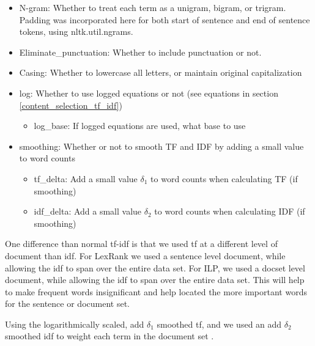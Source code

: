     \begin{itemize}
       
        \item N-gram: Whether to treat each term as a unigram, bigram, or trigram. Padding was incorporated here for both start of sentence and end of sentence tokens, using nltk.util.ngrams.

        \item Eliminate\_punctuation: Whether to include punctuation or not.

        \item Casing: Whether to lowercase all letters, or maintain original capitalization

        \item log: Whether to use logged equations or not (see equations in section \ref{content_selection_tf_idf})

        \begin{itemize}

            \item log\_base: If logged equations are used, what base to use

        \end{itemize}

        \item smoothing: Whether or not to smooth TF and IDF by adding a small value to word counts

        \begin{itemize}

            \item tf\_delta: Add a small value $\delta_1$ to word counts when calculating TF (if smoothing)
    
            \item idf\_delta: Add a small value $\delta_2$ to word counts when calculating IDF (if smoothing)

        \end{itemize}
    \end{itemize}
    One difference than normal tf-idf is that we used tf at a different level of document than idf. For LexRank we used a sentence level document, while allowing the idf to span over the entire data set. For ILP, we used a docset level document, while allowing the idf to span over the entire data set. This will help to make frequent words insignificant and help located the more important words for the sentence or document set.
 
    Using the logarithmically scaled, add $\delta_1$ smoothed tf, and we used an add $\delta_2$ smoothed idf to weight each term in the document set \citep{seki_2003}.

